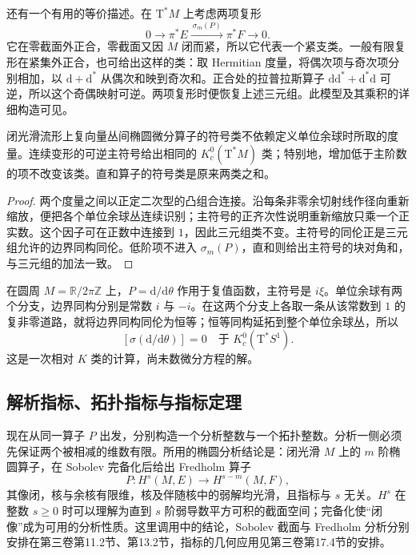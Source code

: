 还有一个有用的等价描述。在 \(\mathrm T^*M\) 上考虑两项复形
\[
	0\longrightarrow\pi^*E\xrightarrow{\ \sigma_m(P)\ }\pi^*F\longrightarrow0.
\]
它在零截面外正合，零截面又因 \(M\) 闭而紧，所以它代表一个紧支类。一般有限复形在紧集外正合，也可给出这样的类：取 Hermitian 度量，将偶次项与奇次项分别相加，以 \(\mathrm d+\mathrm d^*\) 从偶次和映到奇次和。正合处的拉普拉斯算子 \(\mathrm d\mathrm d^*+\mathrm d^*\mathrm d\) 可逆，所以这个奇偶映射可逆。两项复形时便恢复上述三元组。此模型及其乘积的详细构造可见\cite[第2节，第489--494页]{AtiyahSinger1968I}。

\begin{proposition}\label{g2:prop:symbol-class-invariance}
	闭光滑流形上复向量丛间椭圆微分算子的符号类不依赖定义单位余球时所取的度量。连续变形的可逆主符号给出相同的 \(K_c^0(\mathrm T^*M)\) 类；特别地，增加低于主阶数的项不改变该类。直和算子的符号类是原来两类之和。
\end{proposition}
\begin{proof}
	两个度量之间以正定二次型的凸组合连接。沿每条非零余切射线作径向重新缩放，便把各个单位余球丛连续识别；主符号的正齐次性说明重新缩放只乘一个正实数。这个因子可在正数中连接到 \(1\)，因此三元组类不变。主符号的同伦正是三元组允许的边界同构同伦。低阶项不进入 \(\sigma_m(P)\)，直和则给出主符号的块对角和，与三元组的加法一致。
\end{proof}

在圆周 \(M=\mathbb R/2\pi\mathbb Z\) 上，\(P=\mathrm d/\mathrm d\theta\) 作用于复值函数，主符号是 \(i\xi\)。单位余球有两个分支，边界同构分别是常数 \(i\) 与 \(-i\)。在这两个分支上各取一条从该常数到 \(1\) 的复非零道路，就将边界同构同伦为恒等；恒等同构延拓到整个单位余球丛，所以
\begin{equation}\label{g2:eq:circle-derivative-symbol-zero}
	[\sigma(\mathrm d/\mathrm d\theta)]=0\quad\text{于 }K_c^0(\mathrm T^*S^1).
\end{equation}
这是一次相对 \(K\) 类的计算，尚未数微分方程的解。

\subsection{解析指标、拓扑指标与指标定理}
\label{g2:subsec:2404:04}
现在从同一算子 \(P\) 出发，分别构造一个分析整数与一个拓扑整数。分析一侧必须先保证两个被相减的维数有限。所用的椭圆分析结论是：闭光滑 \(M\) 上的 \(m\) 阶椭圆算子，在 Sobolev 完备化后给出 Fredholm 算子
\[
	P:H^s(M,E)\longrightarrow H^{s-m}(M,F),
\]
其像闭，核与余核有限维，核及伴随核中的弱解均光滑，且指标与 \(s\) 无关。\(H^s\) 在整数 \(s\ge0\) 时可以理解为直到 \(s\) 阶弱导数平方可积的截面空间；完备化使“闭像”成为可用的分析性质。这里调用\cite[第6节，式(6.1)，第517--519页]{AtiyahSinger1968I}中的结论，Sobolev 截面与 Fredholm 分析分别安排在第三卷第11.2节、第13.2节，指标的几何应用见第三卷第17.4节的安排。


